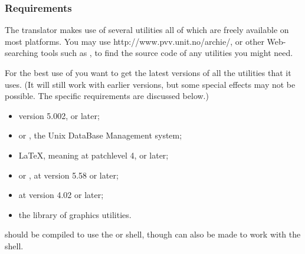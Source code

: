 \htmlrule
\tableofchildlinks

\subsubsection{Requirements}%
\html{\\}%
The translator makes use of several utilities all of which 
are freely available on most platforms. 
You may use \htmladdnormallinkfoot{\html{ }}%
{http://www.pvv.unit.no/archie/}, 
or other Web-searching tools such as %
,
to find the source code of any utilities you might need.

\medskip\noindent
For the best use of \latextohtml{} you want to get the latest
versions of all the utilities that it uses. (It will still work
with earlier versions, but some  special effects may not be possible. 
The specific requirements are discussed below.)
%
\begin{itemize}
\item \Perl{} version 5.002, or later;
\item {} or , the Unix DataBase Management system;
\item \LaTeX, meaning \LaTeXe{} at patchlevel 4, or later;
\item {} or , at version 5.58 or later;
\item {} at version 4.02 or later;
\item the  library of graphics utilities.
\end{itemize}
\Perl{} should be compiled to use the  or  shell,
though \latextohtml{} can also be made to work with the  shell.


